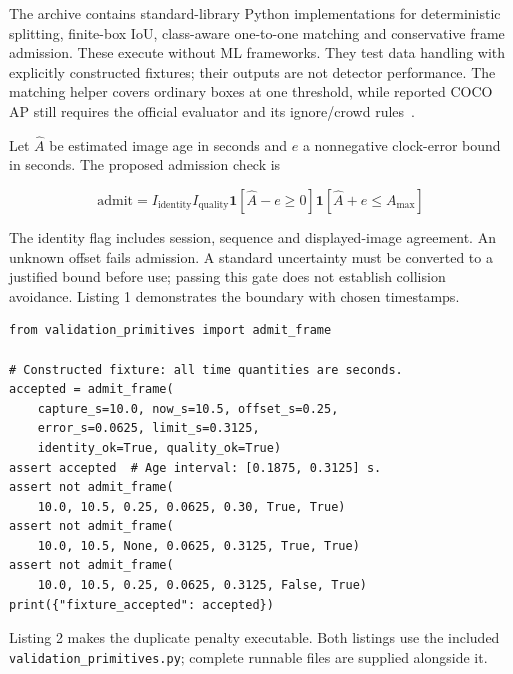 \documentclass[11pt,letterpaper]{article}
\begin{document}
The archive contains standard-library Python implementations for deterministic splitting, finite-box IoU, class-aware one-to-one matching and conservative frame admission. These execute without ML frameworks. They test data handling with explicitly constructed fixtures; their outputs are not detector performance. The matching helper covers ordinary boxes at one threshold, while reported COCO AP still requires the official evaluator and its ignore/crowd rules~\cite{ENG_COCO}.

Let \(\widehat A\) be estimated image age in seconds and \(e\) a nonnegative clock-error bound in seconds. The proposed admission check is

\begin{equation}
\mathrm{admit}=I_{\mathrm{identity}}I_{\mathrm{quality}}
\mathbf{1}[\widehat A-e\geq0]\mathbf{1}[\widehat A+e\leq A_{\max}]
\label{eq:25}
\end{equation}

The identity flag includes session, sequence and displayed-image agreement. An unknown offset fails admission. A standard uncertainty must be converted to a justified bound before use; passing this gate does not establish collision avoidance. Listing 1 demonstrates the boundary with chosen timestamps.

\begin{minipage}{\linewidth}
\begin{lstlisting}[caption={Conservative frame-age admission using explicit clock bounds},label={lst:1}]
from validation_primitives import admit_frame

# Constructed fixture: all time quantities are seconds.
accepted = admit_frame(
    capture_s=10.0, now_s=10.5, offset_s=0.25,
    error_s=0.0625, limit_s=0.3125,
    identity_ok=True, quality_ok=True)
assert accepted  # Age interval: [0.1875, 0.3125] s.
assert not admit_frame(
    10.0, 10.5, 0.25, 0.0625, 0.30, True, True)
assert not admit_frame(
    10.0, 10.5, None, 0.0625, 0.3125, True, True)
assert not admit_frame(
    10.0, 10.5, 0.25, 0.0625, 0.3125, False, True)
print({"fixture_accepted": accepted})
\end{lstlisting}
\end{minipage}

Listing 2 makes the duplicate penalty executable. Both listings use the included \texttt{validation\_primitives.py}; complete runnable files are supplied alongside it.
\end{document}
